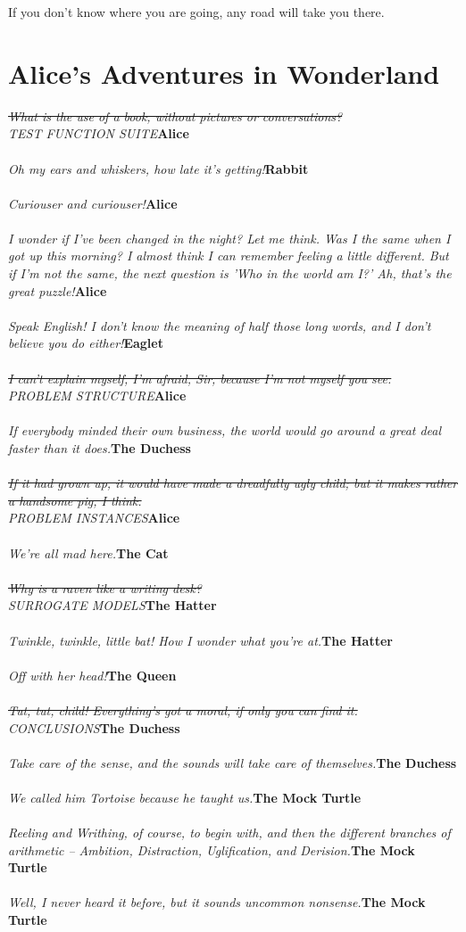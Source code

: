 \documentclass{hi-thesis}
\renewcommand{\quote}[2]{\noindent \emph{#2}\hfill{\bf #1}\\\\}
\begin{document}
\pagestyle{plain} 

\begin{savequote}[75mm] 
If you don't know where you are going, any road will take you there. 
\end{savequote}

\chapter*{Alice's Adventures in Wonderland}

\quote{Alice}{\st{What is the use of a book, without pictures or conversations?}\\TEST FUNCTION SUITE} 
\quote{Rabbit}{Oh my ears and whiskers, how late it's getting!}
\quote{Alice}{Curiouser and curiouser!}
\quote{Alice}{I wonder if I've been changed in the night? Let me think. Was I the same when I got up this morning? I almost think I can remember feeling a little different. But if I'm not the same, the next question is 'Who in the world am I?' Ah, that's the great puzzle!}
\quote{Eaglet}{Speak English! I don't know the meaning of half those long words, and I don't believe you do either!}
\quote{Alice}{\st{I can't explain myself, I'm afraid, Sir, because I'm not myself you see.}\\PROBLEM STRUCTURE}
\quote{The Duchess}{If everybody minded their own business, the world would go around a great deal faster than it does.}
\quote{Alice}{\st{If it had grown up, it would have made a dreadfully ugly child; but it makes rather a handsome pig, I think.}\\PROBLEM INSTANCES}
\quote{The Cat}{We're all mad here.}
\quote{The Hatter}{ \st{Why is a raven like a writing desk?}\\SURROGATE MODELS}
\quote{The Hatter}{Twinkle, twinkle, little bat! How I wonder what you're at.}
\quote{The Queen}{Off with her head!}
\quote{The Duchess}{\st{Tut, tut, child! Everything's got a moral, if only you can find it.}\\CONCLUSIONS}
\quote{The Duchess}{Take care of the sense, and the sounds will take care of themselves.}
\quote{The Mock Turtle}{We called him Tortoise because he taught us.}
\quote{The Mock Turtle}{Reeling and Writhing, of course, to begin with, and then the different branches of arithmetic -- Ambition, Distraction, Uglification, and Derision.}
\quote{The Mock Turtle}{Well, I never heard it before, but it sounds uncommon nonsense.}
\end{document}
